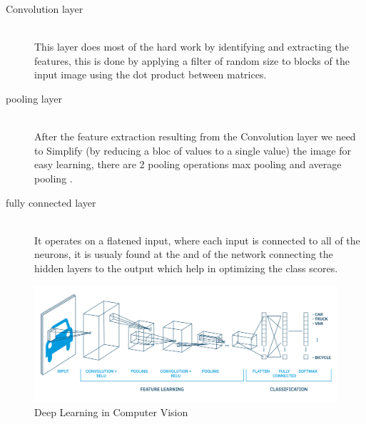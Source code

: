         \begin{description}
        \item[Convolution layer] \hfill \\
            This layer does most of the hard work by identifying and extracting the features, this is done by applying a filter of random size to blocks of the input image using the dot product between matrices.
        \item[pooling layer] \hfill \\ 
            After the feature extraction resulting from the Convolution layer we need to Simplify (by reducing a bloc of values to a single value) the image for easy learning, there are 2 pooling operations max pooling and average pooling .
        \item[fully connected layer] \hfill \\
            It operates on a flatened input, where each input is connected to all of the neurons, it is usualy found at the and of the network connecting the hidden layers to the output which help in optimizing the class scores.
        \end{description}
        \begin{figure}[htbp]
        \begin{center}
        \includegraphics[width=15cm]{./chapter-02-general-ai-information/cnn.png}
        \end{center}
        \caption{Deep Learning in Computer Vision ~\cite{mldlcv}}
        \label{fig:mldlcv}
        \end{figure}
    

